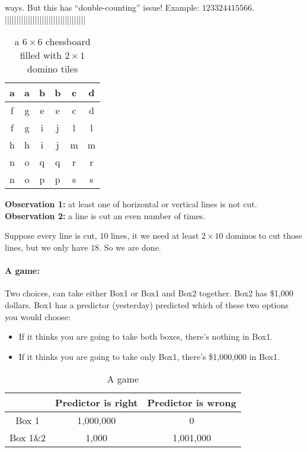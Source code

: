 \documentclass[a4paper, 11pt, twoside]{article}
\begin{document}
ways. But this has ``double-counting'' issue! Example: $123324415566$.\\

|||||||||||||||||||||||||||||||||||

\begin{table}[htbp!] 
	\centering
	\begin{tabular}{|c|c|c|c|c|c|}
		\hline
		a & a & b & b & c & d \\
		\hline
		f & g & e & e & c & d\\
		\hline
		f & g & i & j & l & l\\
		\hline
		h & h & i & j & m & m\\
		\hline
		n & o & q & q & r & r\\
		\hline
		n & o & p & p & s & s\\
		\hline
	\end{tabular}
	\caption{a $6\times 6$ chessboard filled with $2\times 1$ domino tiles} %
\end{table}

\textbf{Observation 1:} at least one of horizontal or vertical lines is not cut.\\

\textbf{Observation 2:} a line is cut an even number of times.

Suppose every line is cut, $10$ lines, it we need at least $2\times 10$ dominos to cut those lines, but we only have $18$. So we are done.\\

\paragraph{A game:} Two choices, can take either Box1 or Box1 and Box2 together. Box2 has \$1,000 dollars. Box1 has a predictor (yesterday) predicted which of these two options you would choose:

\begin{itemize}
	\item If it thinks you are going to take both boxes, there's nothing in Box1.
	\item If it thinks you are going to take only Box1, there's \$1,000,000 in Box1.
\end{itemize}

\begin{table}[htbp!] 
	\centering
	\begin{tabular}{|c|c|c|}
		\hline
		 & Predictor is right & Predictor is wrong \\
		\hline
		Box 1 & 1,000,000 & 0 \\
		\hline
		Box 1\&2 & 1,000 & 1,001,000 \\
		\hline
	\end{tabular}
	\caption{A game} %
\end{table}
\end{document}
